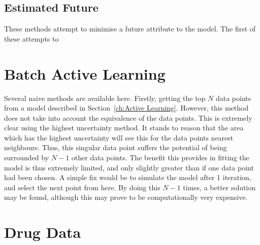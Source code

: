 \documentclass[a4paper, british]{article}
\begin{document}
\subsection{Estimated Future}
These methods attempt to minimise a future attribute to the model. The first of these attempts to
\section{Batch Active Learning}
Several naive methods are available here. Firstly, getting the top $N$ data points from a model described in Section~\ref{ch:Active Learning}. However, this method does not take into account the equivalence of the data points. This is extremely clear using the highest uncertainty method. It stands to reason that the area which has the highest uncertainty will see this for the data points nearest neighbours. Thus, this singular data point suffers the potential of being surrounded by $N-1$ other data points. The benefit this provides in fitting the model is thus extremely limited, and only slightly greater than if one data point had been chosen. A simple fix would be to simulate the model after 1 iteration, and select the next point from here. By doing this $N-1$ times, a better solution may be found, although this may prove to be computationally very expensive.
\section{Drug Data}
\printbibliography{}
\end{document}
